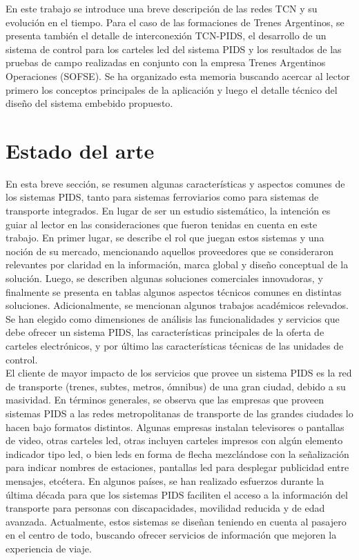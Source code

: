  En este trabajo se introduce una breve descripción de las redes TCN y su evolución en el tiempo. Para el caso de las formaciones de Trenes Argentinos, se presenta también el detalle de interconexión TCN-PIDS, el desarrollo de un sistema de control para los carteles led del sistema PIDS y los resultados de las pruebas de campo realizadas en conjunto con la empresa Trenes Argentinos Operaciones (SOFSE). Se ha organizado esta memoria buscando acercar al lector primero los conceptos principales de la aplicación y luego el detalle técnico del diseño del sistema embebido propuesto. \\

\section{Estado del arte}

En esta breve sección, se resumen algunas características y aspectos comunes de los sistemas PIDS, tanto para sistemas ferroviarios como para sistemas de transporte integrados. En lugar de ser un estudio sistemático, la intención es guiar al lector en las consideraciones que fueron tenidas en cuenta en este trabajo. En primer lugar, se describe el rol que juegan estos sistemas y una noción de su mercado, mencionando aquellos proveedores que se consideraron relevantes por claridad en la información, marca global y diseño conceptual de la solución. Luego, se describen algunas soluciones comerciales innovadoras, y finalmente se presenta en tablas algunos aspectos técnicos comunes en distintas soluciones. Adicionalmente, se mencionan algunos trabajos académicos relevados. Se han elegido como dimensiones de análisis las funcionalidades y servicios que debe ofrecer un sistema PIDS, las características principales de la oferta de carteles electrónicos, y por último las características técnicas de las unidades de control. \\


El cliente de mayor impacto de los servicios que provee un sistema PIDS es la red de transporte (trenes, subtes, metros, ómnibus) de una gran ciudad, debido a su masividad. En términos generales, se observa que las empresas que proveen sistemas PIDS a las redes metropolitanas de transporte de las grandes ciudades lo hacen bajo formatos distintos. Algunas empresas instalan televisores o pantallas de video, otras carteles led, otras incluyen carteles impresos con algún elemento indicador tipo led, o bien leds en forma de flecha mezclándose con la señalización para indicar nombres de estaciones, pantallas led para desplegar publicidad entre mensajes, etcétera. En algunos países, se han realizado esfuerzos durante la última década para que los sistemas PIDS faciliten el acceso a la información del transporte para personas con discapacidades, movilidad reducida y de edad avanzada. Actualmente, estos sistemas se diseñan teniendo en cuenta al pasajero en el centro de todo, buscando ofrecer servicios de información que mejoren la experiencia de viaje.\\

